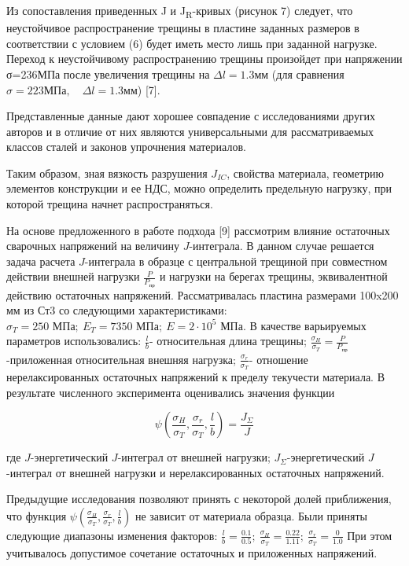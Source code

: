 \begin{multicols}{2}
Из сопоставления приведенных J и J\textsubscript{R}-кривых (рисунок 7)
следует, что неустойчивое распространение трещины в пластине заданных
размеров в соответствии с условием (6) будет иметь место лишь при
заданной нагрузке. Переход к неустойчивому распространению трещины
произойдет при напряжении σ=236МПа после увеличения трещины на
$\Delta l = 1.3 \text{мм}$ (для сравнения
$\sigma = 223 \text{МПа}, \quad \Delta l = 1.3 \text{мм}$) {[}7{]}.

Представленные данные дают хорошее совпадение с исследованиями других
авторов и в отличие от них являются универсальными для рассматриваемых
классов сталей и законов упрочнения материалов.

Таким образом, зная вязкость разрушения
$J_{IC}$, свойства материала, геометрию
элементов конструкции и ее НДС, можно определить предельную нагрузку,
при которой трещина начнет распространяться.

На основе предложенного в работе подхода {[}9{]} рассмотрим влияние
остаточных сварочных напряжений на величину
$J$-интеграла. В данном случае решается
задача расчета $J$-интеграла в образце
с центральной трещиной при совместном действии внешней нагрузки
$\frac{P}{P_{\text{пр}}}$ и нагрузки на берегах трещины,
эквивалентной действию остаточных напряжений. Рассматривалась пластина
размерами 100x200 мм из Ст3 со следующими характеристиками:
$\sigma_{T} = 250 \text{ МПа};\ E_{T} = 7350 \text{ МПа};\ E = 2 \cdot 10^{5} \text{ МПа}$. В качестве варьируемых параметров
использовались: $\frac{l}{b}$- относительная длина
трещины; $\frac{\sigma_{H}}{\sigma_{T}} = \frac{P}{P_{\text{пр}}}$-приложенная относительная
внешняя нагрузка; $\frac{\sigma_{r}}{\sigma_{T}}$- отношение
нерелаксированных остаточных напряжений к пределу текучести материала. В
результате численного эксперимента оценивались значения функции

\begin{equation}
\psi \left( \frac{\sigma_{H}}{\sigma_{T}}, \frac{\sigma_{r}}{\sigma_{T}}, \frac{l}{b} \right) = \frac{J_{\Sigma}}{J}
\end{equation}

где $J$-энергетический
$J$-интеграл от внешней нагрузки;
$J_{\Sigma}$-энергетический
$J$-интеграл от внешней нагрузки и
нерелаксированных остаточных напряжений.

Предыдущие исследования позволяют принять с некоторой долей приближения,
что функция $\psi \left( \frac{\sigma_{H}}{\sigma_{T}}, \frac{\sigma_{r}}{\sigma_{T}}, \frac{l}{b} \right)$ не зависит от материала
образца. Были приняты следующие диапазоны изменения факторов:
$\frac{l}{b} = \frac{0.1}{0.5};\ \frac{\sigma_{H}}{\sigma_{T}} = \frac{0.22}{1.11};\ \frac{\sigma_{r}}{\sigma_{T}} = \frac{0}{1.0}$
 При этом учитывалось допустимое
сочетание остаточных и приложенных напряжений.


\end{multicols}
